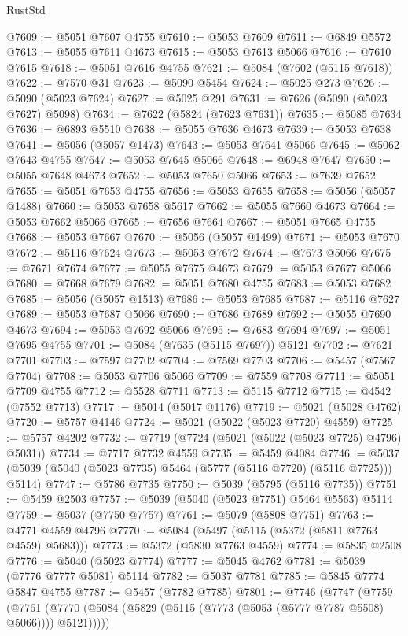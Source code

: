 \begin{lexlean}{RustStd}
\begin{coremodule}
@7609 := @5051 @7607 @4755
@7610 := @5053 @7609
@7611 := @6849 @5572
@7613 := @5055 @7611 @4673
@7615 := @5053 @7613 @5066
@7616 := @7610 @7615
@7618 := @5051 @7616 @4755
@7621 := @5084 (@7602 (@5115 @7618))
@7622 := @7570 @31
@7623 := @5090 @5454
@7624 := @5025 @273
@7626 := @5090 (@5023 @7624)
@7627 := @5025 @291
@7631 := @7626 (@5090 (@5023 @7627) @5098)
@7634 := @7622 (@5824 (@7623 @7631))
@7635 := @5085 @7634
@7636 := @6893 @5510
@7638 := @5055 @7636 @4673
@7639 := @5053 @7638
@7641 := @5056 (@5057 @1473)
@7643 := @5053 @7641 @5066
@7645 := @5062 @7643 @4755
@7647 := @5053 @7645 @5066
@7648 := @6948 @7647
@7650 := @5055 @7648 @4673
@7652 := @5053 @7650 @5066
@7653 := @7639 @7652
@7655 := @5051 @7653 @4755
@7656 := @5053 @7655
@7658 := @5056 (@5057 @1488)
@7660 := @5053 @7658 @5617
@7662 := @5055 @7660 @4673
@7664 := @5053 @7662 @5066
@7665 := @7656 @7664
@7667 := @5051 @7665 @4755
@7668 := @5053 @7667
@7670 := @5056 (@5057 @1499)
@7671 := @5053 @7670
@7672 := @5116 @7624
@7673 := @5053 @7672
@7674 := @7673 @5066
@7675 := @7671 @7674
@7677 := @5055 @7675 @4673
@7679 := @5053 @7677 @5066
@7680 := @7668 @7679
@7682 := @5051 @7680 @4755
@7683 := @5053 @7682
@7685 := @5056 (@5057 @1513)
@7686 := @5053 @7685
@7687 := @5116 @7627
@7689 := @5053 @7687 @5066
@7690 := @7686 @7689
@7692 := @5055 @7690 @4673
@7694 := @5053 @7692 @5066
@7695 := @7683 @7694
@7697 := @5051 @7695 @4755
@7701 := @5084 (@7635 (@5115 @7697)) @5121
@7702 := @7621 @7701
@7703 := @7597 @7702
@7704 := @7569 @7703
@7706 := @5457 (@7567 @7704)
@7708 := @5053 @7706 @5066
@7709 := @7559 @7708
@7711 := @5051 @7709 @4755
@7712 := @5528 @7711
@7713 := @5115 @7712
@7715 := @4542 (@7552 @7713)
@7717 := @5014 (@5017 @1176)
@7719 := @5021 (@5028 @4762)
@7720 := @5757 @4146
@7724 := @5021 (@5022 (@5023 @7720) @4559)
@7725 := @5757 @4202
@7732 := @7719 (@7724 (@5021 (@5022 (@5023 @7725) @4796) @5031))
@7734 := @7717 @7732 @4559
@7735 := @5459 @4084
@7746 := @5037 (@5039 (@5040 (@5023 @7735) @5464 (@5777 (@5116 @7720) (@5116 @7725))) @5114)
@7747 := @5786 @7735
@7750 := @5039 (@5795 (@5116 @7735))
@7751 := @5459 @2503
@7757 := @5039 (@5040 (@5023 @7751) @5464 @5563) @5114
@7759 := @5037 (@7750 @7757)
@7761 := @5079 (@5808 @7751)
@7763 := @4771 @4559 @4796
@7770 := @5084 (@5497 (@5115 (@5372 (@5811 @7763 @4559) @5683)))
@7773 := @5372 (@5830 @7763 @4559)
@7774 := @5835 @2508
@7776 := @5040 (@5023 @7774)
@7777 := @5045 @4762
@7781 := @5039 (@7776 @7777 @5081) @5114
@7782 := @5037 @7781
@7785 := @5845 @7774 @5847 @4755
@7787 := @5457 (@7782 @7785)
@7801 := @7746
    (@7747
      (@7759
        (@7761 (@7770 (@5084 (@5829 (@5115 (@7773 (@5053 (@5777 @7787 @5508) @5066)))) @5121)))))

\end{coremodule}
\end{lexlean}
